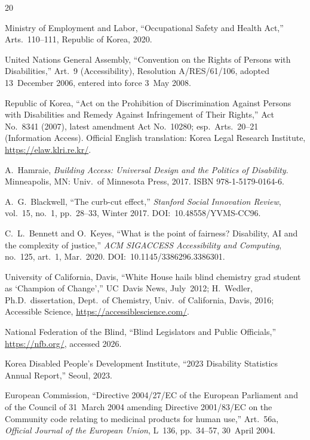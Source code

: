 \documentclass[journal]{IEEEtran}
\begin{document}
\begin{thebibliography}{20}

Ministry of Employment and Labor, ``Occupational Safety and Health Act,'' Arts.~110--111, Republic of Korea, 2020.

United Nations General Assembly, ``Convention on the Rights of Persons with Disabilities,'' Art.~9 (Accessibility), Resolution A/RES/61/106, adopted 13~December 2006, entered into force 3~May 2008.

Republic of Korea, ``Act on the Prohibition of Discrimination Against Persons with Disabilities and Remedy Against Infringement of Their Rights,'' Act No.~8341 (2007), latest amendment Act No.~10280; esp.\ Arts.~20--21 (Information Access). Official English translation: Korea Legal Research Institute, \url{https://elaw.klri.re.kr/}.

A.~Hamraie, \emph{Building Access: Universal Design and the Politics of Disability}. Minneapolis, MN: Univ.\ of Minnesota Press, 2017. ISBN 978-1-5179-0164-6.

A.~G.~Blackwell, ``The curb-cut effect,'' \emph{Stanford Social Innovation Review}, vol.~15, no.~1, pp.~28--33, Winter 2017. DOI:~10.48558/YVMS-CC96.

C.~L.~Bennett and O.~Keyes, ``What is the point of fairness? Disability, AI and the complexity of justice,'' \emph{ACM SIGACCESS Accessibility and Computing}, no.~125, art.~1, Mar.~2020. DOI:~10.1145/3386296.3386301.

University of California, Davis, ``White House hails blind chemistry grad student as `Champion of Change','' UC~Davis News, July~2012; H.~Wedler, Ph.D.\ dissertation, Dept.\ of Chemistry, Univ.\ of California, Davis, 2016; Accessible Science, \url{https://accessiblescience.com/}.

National Federation of the Blind, ``Blind Legislators and Public Officials,'' \url{https://nfb.org/}, accessed 2026.

Korea Disabled People's Development Institute, ``2023 Disability Statistics Annual Report,'' Seoul, 2023.

European Commission, ``Directive 2004/27/EC of the European Parliament and of the Council of 31~March 2004 amending Directive 2001/83/EC on the Community code relating to medicinal products for human use,'' Art.~56a, \emph{Official Journal of the European Union}, L~136, pp.~34--57, 30~April 2004.


\end{thebibliography}
\end{document}
